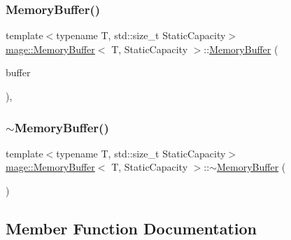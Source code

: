 \mbox{\label{classmage_1_1_memory_buffer_a7610cdb6d5ad24f44c62059de80c90ba}} 
\subsubsection{\texorpdfstring{Memory\+Buffer()}{MemoryBuffer()}\hspace{0.1cm}{\footnotesize\ttfamily [3/3]}}
{\footnotesize\ttfamily template$<$typename T, std\+::size\+\_\+t Static\+Capacity$>$ \\
\mbox{\hyperlink{classmage_1_1_memory_buffer}{mage\+::\+Memory\+Buffer}}$<$ T, Static\+Capacity $>$\+::\mbox{\hyperlink{classmage_1_1_memory_buffer}{Memory\+Buffer}} (\begin{DoxyParamCaption}\item[{\mbox{\hyperlink{classmage_1_1_memory_buffer}{Memory\+Buffer}}$<$ T, Static\+Capacity $>$ \&\&}]{buffer }\end{DoxyParamCaption})\hspace{0.3cm}{\ttfamily [default]}, {\ttfamily [noexcept]}}

\mbox{\label{classmage_1_1_memory_buffer_afef5a288aa415671bb0a8ef28a523cde}} 
\subsubsection{\texorpdfstring{$\sim$\+Memory\+Buffer()}{~MemoryBuffer()}}
{\footnotesize\ttfamily template$<$typename T, std\+::size\+\_\+t Static\+Capacity$>$ \\
\mbox{\hyperlink{classmage_1_1_memory_buffer}{mage\+::\+Memory\+Buffer}}$<$ T, Static\+Capacity $>$\+::$\sim$\mbox{\hyperlink{classmage_1_1_memory_buffer}{Memory\+Buffer}} (\begin{DoxyParamCaption}{ }\end{DoxyParamCaption})\hspace{0.3cm}{\ttfamily [default]}}



\subsection{Member Function Documentation}
\mbox{\label{classmage_1_1_memory_buffer_a313cd978aee882d5f81162ced435af10}} 
